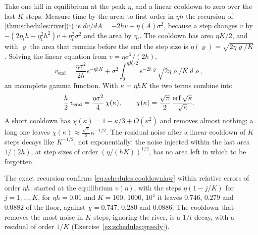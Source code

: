\begin{refsection}
\begin{heuristic}
Take one hill in equilibrium at the peak $\eta$, and a linear cooldown to zero over the last $K$ steps. Measure time by the area: to first order in $\eta h$ the recursion of \cref{thm:schedules:river}(i) is $dv/dA=-2hv+\eta(A)\sigma^2$, because a step changes $v$ by $-(2\eta_th-\eta_t^2h^2)v+\eta_t^2\sigma^2$ and the area by $\eta_t$. The cooldown has area $\eta K/2$, and with $\varrho$ the area that remains before the end the step size is $\eta(\varrho)=\sqrt{2\eta\varrho/K}$. Solving the linear equation from $v=\eta\sigma^2/(2h)$,
\[
  v_{\mathrm{end}}=\frac{\eta\sigma^2}{2h}e^{-\eta hK}+\sigma^2\int_0^{\eta K/2}e^{-2h\varrho}\sqrt{2\eta\varrho/K}\,d\varrho ,
\]
an incomplete gamma function. With $\kappa=\eta hK$ the two terms combine into
\begin{equation}\label{eq:schedules:cooldownlaw}
  \frac h2\,v_{\mathrm{end}}=\frac{\eta\sigma^2}4\,\chi(\kappa),\qquad \chi(\kappa)=\frac{\sqrt\pi}2\,\frac{\operatorname{erf}\sqrt\kappa}{\sqrt\kappa} .
\end{equation}
A short cooldown has $\chi(\kappa)=1-\kappa/3+O(\kappa^2)$ and removes almost nothing; a long one leaves $\chi(\kappa)\approx\frac{\sqrt\pi}2\kappa^{-1/2}$. The residual noise after a linear cooldown of $K$ steps decays like $K^{-1/2}$, not exponentially: the noise injected within the last area $1/(2h)$, at step sizes of order $(\eta/(hK))^{1/2}$, has no area left in which to be forgotten.\qedhere
\end{heuristic}

The exact recursion confirms \eqref{eq:schedules:cooldownlaw} within relative errors of order $\eta h$: started at the equilibrium $v(\eta)$, with the steps $\eta(1-j/K)$ for $j=1,\dots,K$, for $\eta h=0.01$ and $K=100$, $1000$, $10^4$ it leaves $0.746$, $0.279$ and $0.0882$ of the floor, against $\chi=0.747$, $0.280$ and $0.0886$. The cooldown that removes the most noise in $K$ steps, ignoring the river, is a $1/t$ decay, with a residual of order $1/K$ (Exercise~\ref{ex:schedules:greedy}).


\end{refsection}

